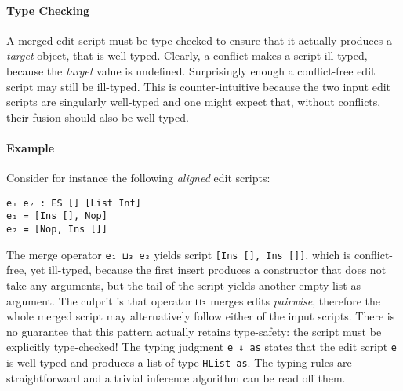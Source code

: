 \documentclass{sigplanconf}
\theoremstyle{plain}
\begin{document}
\paragraph{Type Checking}
A merged edit script must be type-checked to ensure that it actually
produces a \emph{target} object, that is well-typed.
%
Clearly, a conflict makes a script ill-typed, because the \emph{target}
value is undefined.
%
Surprisingly enough a conflict-free edit script may still be
ill-typed.
%
This is counter-intuitive because the two input edit scripts are
singularly well-typed and one might expect that, without conflicts,
their fusion should also be well-typed.
%

\paragraph{Example} Consider for instance the following \emph{aligned}
edit scripts:
\begin{verbatim}
e₁ e₂ : ES [] [List Int]
e₁ = [Ins [], Nop]
e₂ = [Nop, Ins []]
\end{verbatim}
The merge operator \texttt{e₁ ⊔₃ e₂} yields script \texttt{[Ins [],
  Ins []]}, which is conflict-free, yet ill-typed, because the first
insert produces a constructor that does not take any arguments, but
the tail of the script yields another empty list as argument.
%
The culprit is that operator \texttt{⊔₃} merges edits \emph{pairwise},
therefore the whole merged script may alternatively follow either of
the input scripts.
%
There is no guarantee that this pattern actually retains type-safety:
the script must be explicitly type-checked!
%
The typing judgment \texttt{e ⇓ as} states that the edit script
\texttt{e} is well typed and produces a list of type \texttt{HList
  as}.
%
The typing rules are straightforward and a trivial inference algorithm
can be read off them.
%
        
\end{document}
